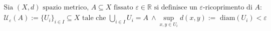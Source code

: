 \documentclass[preview]{standalone}
\begin{document}
\begin{align*}
\text{Sia } (X, d) \text{ spazio metrico, } A \subseteq X \text{ fissato } \varepsilon \in \mathbb{R} \text{ si definisce un } \varepsilon\text{-ricoprimento di } A: \\ \mathcal{U}_{\varepsilon}(A) :=  \{U_i\}_{i \in I} \subseteq X \text{ tale che } \bigcup_{i \in I} U_i = A  \ \land \sup_{x,y \in U_i} d(x,y) := \text{ diam}(U_i) < \varepsilon
\end{align*}
\end{document}
